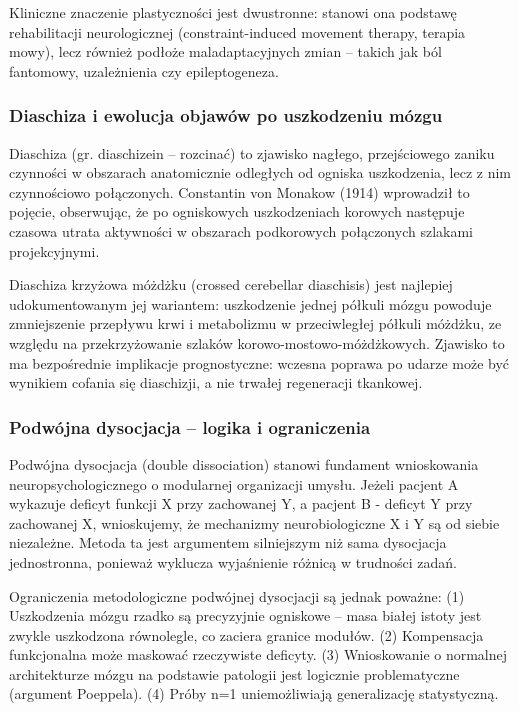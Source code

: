 \documentclass[11pt,a4paper]{article}
\begin{document}
Kliniczne znaczenie plastyczności jest dwustronne: stanowi ona podstawę rehabilitacji neurologicznej (constraint-induced movement therapy, terapia mowy), lecz również podłoże maladaptacyjnych zmian – takich jak ból fantomowy, uzależnienia czy epileptogeneza.

\subsubsection{Diaschiza i ewolucja objawów po uszkodzeniu mózgu}

Diaschiza (gr. diaschizein – rozcinać) to zjawisko nagłego, przejściowego zaniku czynności w obszarach anatomicznie odległych od ogniska uszkodzenia, lecz z nim czynnościowo połączonych. Constantin von Monakow (1914) wprowadził to pojęcie, obserwując, że po ogniskowych uszkodzeniach korowych następuje czasowa utrata aktywności w obszarach podkorowych połączonych szlakami projekcyjnymi.

Diaschiza krzyżowa móżdżku (crossed cerebellar diaschisis) jest najlepiej udokumentowanym jej wariantem: uszkodzenie jednej półkuli mózgu powoduje zmniejszenie przepływu krwi i metabolizmu w przeciwległej półkuli móżdżku, ze względu na przekrzyżowanie szlaków korowo-mostowo-móżdżkowych. Zjawisko to ma bezpośrednie implikacje prognostyczne: wczesna poprawa po udarze może być wynikiem cofania się diaschizji, a nie trwałej regeneracji tkankowej.

\subsubsection{Podwójna dysocjacja – logika i ograniczenia}

Podwójna dysocjacja (double dissociation) stanowi fundament wnioskowania neuropsychologicznego o modularnej organizacji umysłu. Jeżeli pacjent A wykazuje deficyt funkcji X przy zachowanej Y, a pacjent B - deficyt Y przy zachowanej X, wnioskujemy, że mechanizmy neurobiologiczne X i Y są od siebie niezależne. Metoda ta jest argumentem silniejszym niż sama dysocjacja jednostronna, ponieważ wyklucza wyjaśnienie różnicą w trudności zadań.

Ograniczenia metodologiczne podwójnej dysocjacji są jednak poważne: (1) Uszkodzenia mózgu rzadko są
precyzyjnie ogniskowe – masa białej istoty jest zwykle uszkodzona równolegle, co zaciera granice modułów.
(2) Kompensacja funkcjonalna może maskować rzeczywiste deficyty. (3) Wnioskowanie o normalnej
architekturze mózgu na podstawie patologii jest logicznie problematyczne (argument Poeppela). (4) Próby n=1
uniemożliwiają generalizację statystyczną.
\end{document}
